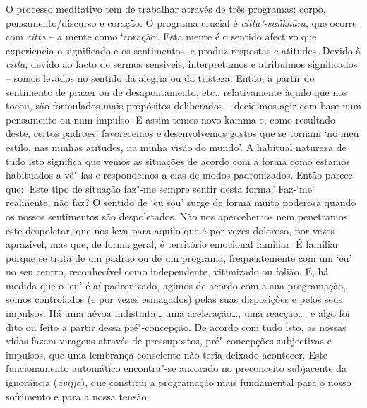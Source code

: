 O processo meditativo tem de trabalhar através de três programas: corpo,
pensamento/discurso e coração.
O programa crucial é \emph{citta"-saṅkhāra}, que ocorre com \emph{citta} -- a
mente como `coração'. Esta mente é o sentido afectivo que experiencia o
significado e os sentimentos, e produz respostas e atitudes. Devido à
\emph{citta}, devido ao facto de sermos sensíveis, interpretamos e atribuímos
significados -- somos levados no sentido da alegria ou da tristeza. Então, a
partir do sentimento de prazer ou de desapontamento, etc., relativamente àquilo
que nos tocou, são formulados mais propósitos deliberados -- decidimos agir com
base num pensamento ou num impulso. E assim temos novo kamma e, como resultado
deste, certos padrões: favorecemos e desenvolvemos gostos que se tornam `no meu
estilo, nas minhas atitudes, na minha visão do mundo'. A habitual natureza de
tudo isto significa que vemos as situações de acordo com a forma como estamos
habituados a vê"-las e respondemos a elas de modos padronizados. Então parece
que: `Este tipo de situação faz"-me sempre sentir desta forma.' Faz-`me'
realmente, não faz? O sentido de `eu sou' surge de forma muito poderosa quando
os nossos sentimentos são despoletados. Não nos apercebemos nem penetramos este
despoletar, que nos leva para aquilo que é por vezes doloroso, por vezes
aprazível, mas que, de forma geral, é território emocional familiar. É familiar
porque se trata de um padrão ou de um programa, frequentemente com um `eu' no
seu centro, reconhecível como independente, vitimizado ou folião. E, há medida
que o `eu' é aí padronizado, agimos de acordo com a sua programação, somos
controlados (e por vezes esmagados) pelas suas disposições e pelos seus
impulsos. Há uma névoa indistinta\ldots{} uma aceleração\ldots{}, uma reacção\ldots{}, e
algo foi dito ou feito a partir dessa pré"-concepção. De acordo com tudo isto, as
nossas vidas fazem viragens através de pressupostos, pré"-concepções subjectivas
e impulsos, que uma lembrança consciente não teria deixado acontecer. Este
funcionamento automático encontra"-se ancorado no preconceito subjacente da
ignorância (\emph{avijja}), que constitui a programação mais fundamental para o
nosso sofrimento e para a nossa tensão.

